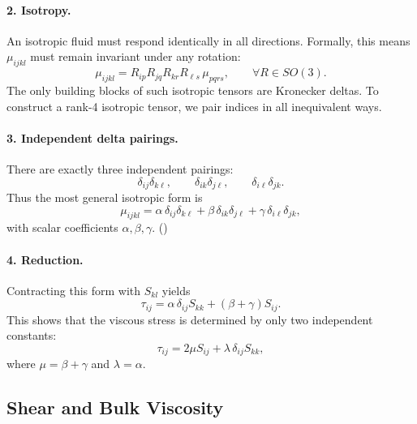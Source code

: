 \paragraph{2. Isotropy.}
An isotropic fluid must respond identically in all directions. Formally, this means $\mu_{ijkl}$ must remain invariant under any rotation:
\[
\mu_{ijkl} = R_{ip}R_{jq}R_{kr}R_{\ell s}\,\mu_{pqrs}, \qquad \forall R \in SO(3).
\]
The only building blocks of such isotropic tensors are Kronecker deltas. To construct a rank-4 isotropic tensor, we pair indices in all inequivalent ways.

\paragraph{3. Independent delta pairings.}
There are exactly three independent pairings:
\[
\delta_{ij}\delta_{k\ell}, \qquad
\delta_{ik}\delta_{j\ell}, \qquad
\delta_{i\ell}\delta_{jk}.
\]
Thus the most general isotropic form is
\[
\mu_{ijkl} = \alpha \,\delta_{ij}\delta_{k\ell}
+ \beta \,\delta_{ik}\delta_{j\ell}
+ \gamma \,\delta_{i\ell}\delta_{jk},
\]
with scalar coefficients $\alpha,\beta,\gamma$. ()

\paragraph{4. Reduction.}
Contracting this form with $S_{kl}$ yields
\[
\tau_{ij} = \alpha \,\delta_{ij} S_{kk} + (\beta + \gamma) S_{ij}.
\]
This shows that the viscous stress is determined by only two independent constants:
\[
\tau_{ij} = 2\mu S_{ij} + \lambda \,\delta_{ij} S_{kk},
\]
where $\mu = \beta + \gamma$ and $\lambda = \alpha$.

\subsection{Shear and Bulk Viscosity}

